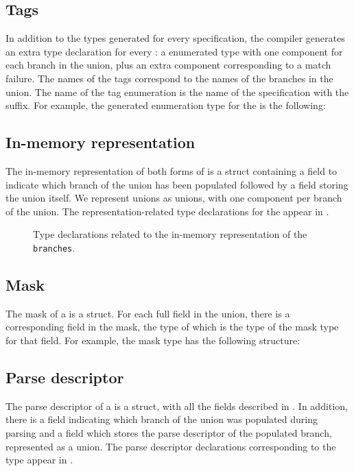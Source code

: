 \subsection{Tags}
In addition to the types generated for every \pads{} specification,
the \pads{} compiler generates an extra type 
declaration for every \Punion{}: a enumerated type with one component
for each branch in the union, plus an extra component corresponding to
a match failure.  The names of the tags correspond to the names of the
branches in the union.  The name of the tag enumeration is the name of
the \pads{} specification with the  suffix.
For example, the generated enumeration type
for the \Punion{}  is the following:

%


\subsection{In-memory representation}
\label{sec:unions-rep}
The in-memory representation of both forms of \Punion{} is 
a \C{} struct containing a  field to indicate which branch of the
union has been populated followed by a  field storing the union
itself.  We represent unions as \C{} unions, with one component per
branch of the union.  
The representation-related type declarations for
the \Punion{}  appear in .

\begin{figure}

\caption{Type declarations related to the in-memory representation of
  the \Punion{} \texttt{branches}.}
\label{fig:punion-rep}
\end{figure}

\subsection{Mask}
\label{sec:unions-masks}
The mask of a \Punion{} is a \C{} struct.  
For each full field in the union,
there is a corresponding field in the mask, the type of which is the
type of the mask type for that field.   For example, the mask type
 has the following structure:


\subsection{Parse descriptor}
\label{sec:unions-parse-descriptors}
The parse descriptor of a \Punion{} is a \C{} struct, with all
the fields described in . In
addition,  there is a  field indicating which branch of the
union was populated during parsing and a  field which stores
the parse descriptor of the populated branch, represented as a \C{}
union.  The parse descriptor declarations corresponding to the
\pads{} type 
appear in .

